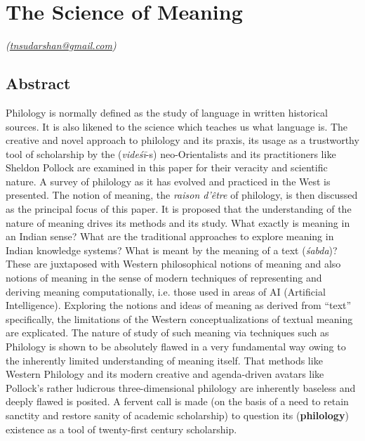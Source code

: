 \chapter{The Science of Meaning}\label{chapter7}


\vskip -3pt

\hfill{\sl(\url{tnsudarshan@gmail.com})}

\section*{Abstract}

Philology is normally defined as the study of language in written historical sources. It is also likened to the science which teaches us what language is. The creative and novel approach to philology and its praxis, its usage as a trustworthy tool of scholarship by the (\textit{videśī}-s) neo-Orientalists and its practitioners like Sheldon Pollock are examined in this paper for their veracity and scientific nature. A survey of philology as it has evolved and practiced in the West is presented. The notion of meaning, the \textit{raison d’être} of philology, is then discussed as the principal focus of this paper. It is proposed that the understanding of the nature of meaning drives its methods and its study. What exactly is meaning in an Indian sense? What are the traditional approaches to explore meaning in Indian knowledge systems? What is meant by the meaning of a text (\textit{śabda})? These are juxtaposed with Western philosophical notions of meaning and also notions of meaning in the sense of modern techniques of representing and deriving meaning computationally, i.e. those used in areas of AI (Artificial Intelligence). Exploring the notions and ideas of meaning as derived from “text” specifically, the limitations of the Western conceptualizations of textual meaning are explicated. The nature of study of such meaning via techniques such as Philology is shown to be absolutely flawed in a very fundamental way owing to the inherently limited understanding of meaning itself. That methods like Western Philology and its modern creative and agenda-driven avatars like Pollock’s rather ludicrous three-dimensional philology are inherently baseless and deeply flawed is posited. A fervent call is made (on the basis of a need to retain sanctity and restore sanity of academic scholarship) to question its (\textbf{philology}) existence as a tool of twenty-first century scholarship.

